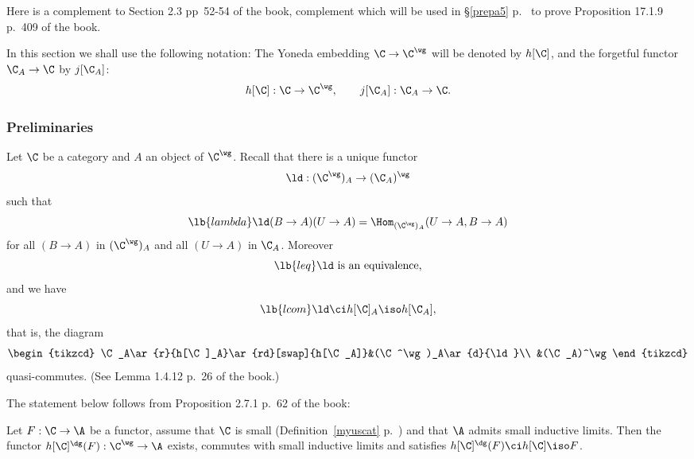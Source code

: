 \documentclass[12pt]{article}
\theoremstyle{remark}
\theoremstyle{definition}
\begin{document}


Here is a complement to Section 2.3 pp~52-54 of the book, complement which will be used in \S\ref{prepa5} p.~ to prove Proposition 17.1.9 p.~409 of the book. 

In this section we shall use the following notation: The Yoneda embedding $\C\to\C^\wg$ will be denoted by $h[\C]$, and the forgetful functor $\C_A\to\C$ by $j[\C_A]$: 
$$
h[\C]:\C\to\C^\wg,\qquad j[\C_A]:\C_A\to\C.
$$

\subsubsection{Preliminaries}

Let $\C$ be a category and $A$ an object of $\C^\wg$. Recall that there is a unique functor 
$$
\ld:(\C^\wg)_A\to(\C_A)^\wg
$$ 
such that 
\begin{equation}\lb{lambda}
\ld(B\to A)(U\to A)=\Hom_{(\C^\wg)_A}(U\to A,B\to A)
\end{equation} 
for all $(B\to A)$ in $(\C^\wg)_A$ and all $(U\to A)$ in $\C_A$. Moreover 
\begin{equation}\lb{leq}
\text{$\ld$ is an equivalence,}
\end{equation} 
and we have 
\begin{equation}\lb{lcom}
\ld\ci h[\C]_A\iso h[\C_A],
\end{equation}
that is, the diagram
$$
\begin{tikzcd}
\C_A\ar{r}{h[\C]_A}\ar{rd}[swap]{h[\C_A]}&(\C^\wg)_A\ar{d}{\ld}\\ 
&(\C_A)^\wg
\end{tikzcd}
$$ 
quasi-commutes. (See Lemma 1.4.12 p.~26 of the book.) 

The statement below follows from Proposition 2.7.1 p.~62 of the book:

\begin{prop}
Let $F:\C\to\A$ be a functor, assume that $\C$ is small (Definition~\ref{myuscat} p.~) and that $\A$ admits small inductive limits. Then the functor $h[\C]^\dg(F):\C^\wg\to\A$ exists, commutes with small inductive limits and satisfies $h[\C]^\dg(F)\ci h[\C]\iso F$.
\end{prop}


\end{document}
